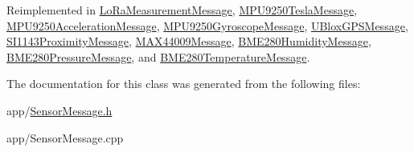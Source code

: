 Reimplemented in \hyperlink{class_lo_ra_measurement_message_adc396198b07614cbdf3b63f5933a4c8a}{Lo\+Ra\+Measurement\+Message}, \hyperlink{class_m_p_u9250_tesla_message_ab26adfdc4c479d892ac7152f7e988229}{M\+P\+U9250\+Tesla\+Message}, \hyperlink{class_m_p_u9250_acceleration_message_a76afe97e9852bfea5b29b6b9a41647aa}{M\+P\+U9250\+Acceleration\+Message}, \hyperlink{class_m_p_u9250_gyroscope_message_ae090d5bd7484413970db2d80929bd0f5}{M\+P\+U9250\+Gyroscope\+Message}, \hyperlink{class_u_blox_g_p_s_message_a163a535b6947f79ca60e9ccbd10f8327}{U\+Blox\+G\+P\+S\+Message}, \hyperlink{class_s_i1143_proximity_message_a17ecf5362d65923d106d729103f67580}{S\+I1143\+Proximity\+Message}, \hyperlink{class_m_a_x44009_message_ab34f5b992a01dd21f567c31b1af75b61}{M\+A\+X44009\+Message}, \hyperlink{class_b_m_e280_humidity_message_acdee6e41c92c624cfd9dde11a7781e5d}{B\+M\+E280\+Humidity\+Message}, \hyperlink{class_b_m_e280_pressure_message_a39d1703529dbc2d06480a16f87616500}{B\+M\+E280\+Pressure\+Message}, and \hyperlink{class_b_m_e280_temperature_message_a783ed2e838818dce058065b55773c3c3}{B\+M\+E280\+Temperature\+Message}.



The documentation for this class was generated from the following files\+:\begin{DoxyCompactItemize}
\item 
app/\hyperlink{_sensor_message_8h}{Sensor\+Message.\+h}\item 
app/Sensor\+Message.\+cpp\end{DoxyCompactItemize}
